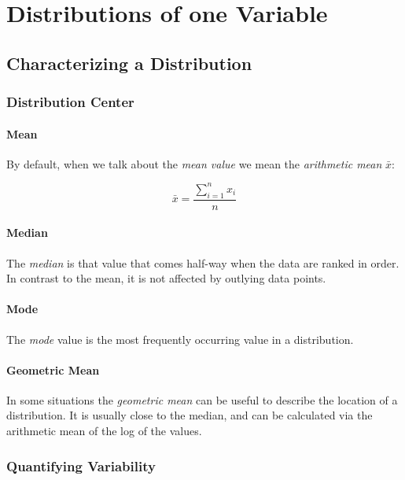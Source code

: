 \chapter{Distributions of one Variable}


\section{Characterizing a Distribution}

\subsection{ Distribution Center }
\subsubsection{ Mean } 
By default, when we talk about the \emph{mean value} we mean the \emph{arithmetic mean} $\bar{x}$:

\begin{equation}
  \bar{x} = \frac{{\sum\limits_{i = 1}^n {{x_i}} }}{n}
\end{equation}

\subsubsection{ Median } 
The \emph{median} is that value that comes half-way when the data are ranked in order.
In contrast to the mean, it is not affected by outlying data points.

\subsubsection{ Mode } 
The \emph{mode} value is the most frequently occurring value in a distribution.

\subsubsection{ Geometric Mean }
In some situations the \emph{geometric mean} can be useful to describe the location of a distribution. It is usually close to the median, and can be calculated via the arithmetic mean of the log of the values.

\subsection{ Quantifying Variability }\label{sec:centiles}

